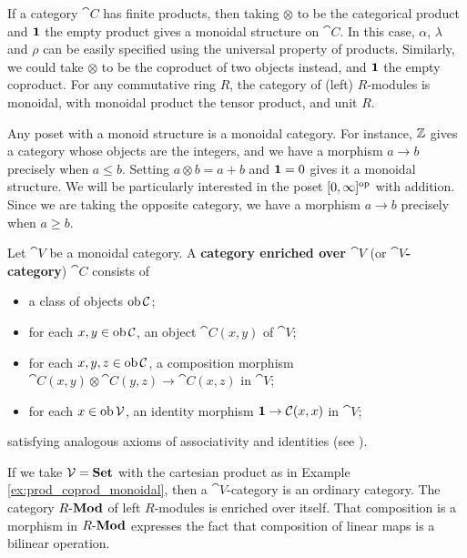 \begin{example}\label{ex:prod_coprod_monoidal}
    If a category $\cat{C}$ has finite products, then taking $\otimes$ to be the categorical product and $\mathbf{1}$ the empty product gives a monoidal structure on $\cat{C}$. In this case, $\alpha$, $\lambda$ and $\rho$ can be easily specified using the universal property of products. Similarly, we could take $\otimes$ to be the coproduct of two objects instead, and $\mathbf{1}$ the empty coproduct. For any commutative ring $R$, the category of (left) $R$-modules is monoidal, with monoidal product the tensor product, and unit $R$.
\end{example}

\begin{example}\label{ex:poset_monoidal}
    Any poset with a monoid structure is a monoidal category. For instance, $\mathbb{Z}$ gives a category whose objects are the integers, and we have a morphism $a \to b$ precisely when $a \leq b$. Setting $a \otimes b = a + b$ and $\mathbf{1} = 0$ gives it a monoidal structure. We will be particularly interested in the poset $[0,\infty]^{\mathrm{op}}$ with addition. Since we are taking the opposite category, we have a morphism $a \to b$ precisely when $a \geq b$.
\end{example}

\begin{definition}
    Let $\cat{V}$ be a monoidal category. A \textbf{category enriched over $\cat{V}$} (or \textbf{$\cat{V}$-category}) $\cat{C}$ consists of 
    \begin{itemize}[nosep, leftmargin=1.2em]
        \item a class of objects $\operatorname{ob} \mathcal{C}$;
        \item for each $x,y \in \operatorname{ob} \mathcal{C}$, an object $\cat{C}(x,y)$ of $\cat{V}$;
        \item for each $x,y,z \in \operatorname{ob} \mathcal{C}$, a composition morphism $\cat{C}(x,y) \otimes \cat{C}(y,z) \to \cat{C}(x,z)$ in $\cat{V}$;
        \item for each $x \in \operatorname{ob} \mathcal{V}$, an identity morphism $\mathbf{1} \to \mathcal{C}(x,x)$ in $\cat{V}$;
    \end{itemize}
    satisfying analogous axioms of associativity and identities (see \cite[Chapter 6]{Borceux1994}).
\end{definition}

\begin{example}
    If we take $\mathcal{V} = \mathbf{Set}$ with the cartesian product as in Example \ref{ex:prod_coprod_monoidal}, then a $\cat{V}$-category is an ordinary category. The category $R\text{-}\mathbf{Mod}$ of left $R$-modules is enriched over itself. That composition is a morphism in $R\text{-}\mathbf{Mod}$ expresses the fact that composition of linear maps is a bilinear operation.
\end{example}

